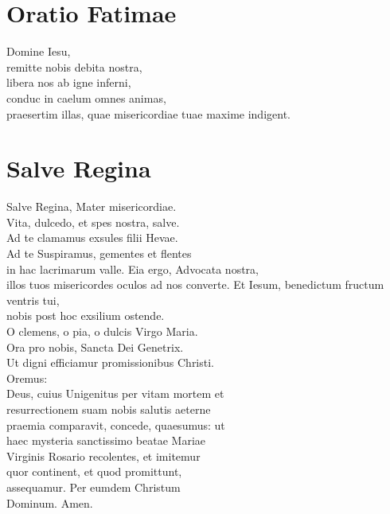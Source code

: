 \documentclass[paper=a5,pagesize=pdftex,fontsize=10pt,headinclude=on,twoside=off]{scrbook}
\begin{document}
\section{Oratio Fatimae}
\begin{scripture}
  \begin{poetry}
    Domine Iesu,\\
    remitte nobis debita nostra,\\
    libera nos ab igne inferni,\\
    conduc in caelum omnes animas,\\
    praesertim illas, quae misericordiae tuae maxime indigent.\\
  \end{poetry}
\end{scripture}

\section{Salve Regina}
\begin{scripture}
  \begin{poetry}
    Salve Regina, Mater misericordiae.\\
    Vita, dulcedo, et spes nostra, salve.\\
    Ad te clamamus exsules filii Hevae.\\
    Ad te Suspiramus, gementes et flentes\\
    in hac lacrimarum valle.
    Eia ergo, Advocata nostra, \\
    illos tuos misericordes oculos ad nos converte.
    Et Iesum, benedictum fructum ventris tui, \\
    nobis post hoc exsilium ostende.\\
    O clemens, o pia, o dulcis Virgo Maria.\\
    Ora pro nobis, Sancta Dei Genetrix.\\
    Ut digni efficiamur promissionibus Christi.\\
    Oremus:\\
    Deus, cuius Unigenitus per vitam mortem et\\
    resurrectionem suam nobis salutis aeterne\\
    praemia comparavit, concede, quaesumus: ut\\
    haec mysteria sanctissimo beatae Mariae\\
    Virginis Rosario recolentes, et imitemur\\
    quor continent, et quod promittunt,\\
    assequamur. Per eumdem Christum\\
    Dominum. Amen.\\
  \end{poetry}
\end{scripture}

\end{document}
